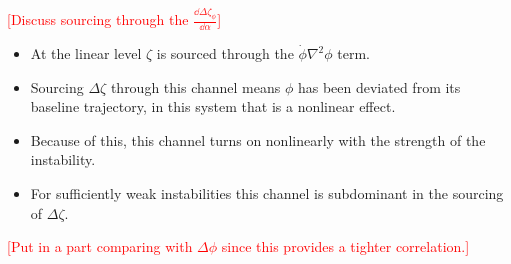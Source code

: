 \textcolor{red}{[Discuss sourcing through the $\frac{\dd\Delta\zeta_\phi}{\dd\alpha}$]}
\begin{itemize}
  \color{red}
  \item At the linear level $\zeta$ is sourced through the $\dot{\phi}\nabla^2\phi$ term.
  \item Sourcing $\Delta\zeta$ through this channel means $\phi$ has been deviated from its baseline trajectory, in this system that is a nonlinear effect.
  \item Because of this, this channel turns on nonlinearly with the strength of the instability.
  \item For sufficiently weak instabilities this channel is subdominant in the sourcing of $\Delta\zeta$.
\end{itemize}



\textcolor{red}{[Put in a part comparing with $\Delta\phi$ since this provides a tighter correlation.]}
